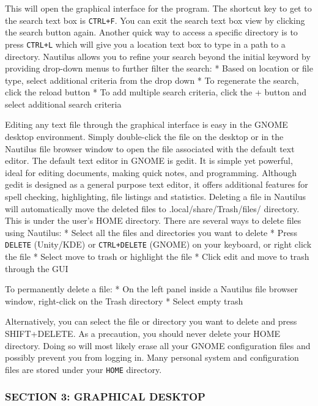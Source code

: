This will open the graphical interface for the program. The shortcut key
to get to the search text box is \texttt{CTRL+F}. You can exit the
search text box view by clicking the search button again. Another quick
way to access a specific directory is to press \texttt{CTRL+L} which
will give you a location text box to type in a path to a directory.
Nautilus allows you to refine your search beyond the initial keyword by
providing drop-down menus to further filter the search: * Based on
location or file type, select additional criteria from the drop down *
To regenerate the search, click the reload button * To add multiple
search criteria, click the + button and select additional search
criteria

Editing any text file through the graphical interface is easy in the
GNOME desktop environment. Simply double-click the file on the desktop
or in the Nautilus file browser window to open the file associated with
the default text editor. The default text editor in GNOME is gedit. It
is simple yet powerful, ideal for editing documents, making quick notes,
and programming. Although gedit is designed as a general purpose text
editor, it offers additional features for spell checking, highlighting,
file listings and statistics. Deleting a file in Nautilus will
automatically move the deleted files to .local/share/Trash/files/
directory. This is under the user's HOME directory. There are several
ways to delete files using Nautilus: * Select all the files and
directories you want to delete * Press \texttt{DELETE} (Unity/KDE) or
\texttt{CTRL+DELETE} (GNOME) on your keyboard, or right click the file *
Select move to trash or highlight the file * Click edit and move to
trash through the GUI

To permanently delete a file: * On the left panel inside a Nautilus file
browser window, right-click on the Trash directory * Select empty trash

Alternatively, you can select the file or directory you want to delete
and press SHIFT+DELETE. As a precaution, you should never delete your
HOME directory. Doing so will most likely erase all your GNOME
configuration files and possibly prevent you from logging in. Many
personal system and configuration files are stored under your
\texttt{HOME} directory.

\subsubsection{SECTION 3: GRAPHICAL
DESKTOP}\label{section-3-graphical-desktop}

